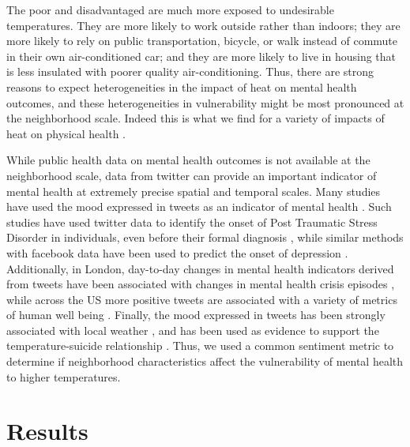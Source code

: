 \documentclass[fleqn,10pt]{wlscirep}
\begin{document}
The poor and disadvantaged are much more exposed to undesirable temperatures.  They are more likely to work outside rather than indoors; they are more likely to rely on public transportation, bicycle, or walk instead of commute in their own air-conditioned car; and they are more likely to live in housing that is less insulated with poorer quality air-conditioning.  Thus, there are strong reasons to expect heterogeneities in the impact of heat on mental health outcomes, and these heterogeneities in vulnerability might be most pronounced at the neighborhood scale.  Indeed this is what we find for a variety of impacts of heat on physical health  \cite{Belanger2015Mar, Uejio2011Mar}.

While public health data on mental health outcomes is not available at the neighborhood scale, data from twitter can provide an important indicator of mental health at extremely precise spatial and temporal scales.  Many studies have used the mood expressed in tweets as an indicator of mental health \cite{Edo-Osagie2020Jul, Sinnenberg2016Dec}.  Such studies have used twitter data to identify the onset of Post Traumatic Stress Disorder in individuals, even before their formal diagnosis \cite{Reece2017Oct}, while similar methods with facebook data have been used to predict the onset of depression \cite{Eichstaedt2018Oct}.  Additionally, in London, day-to-day changes in mental health indicators derived from tweets have been associated with changes in mental health crisis episodes \cite{Kolliakou2020Feb}, while across the US more positive tweets are associated with a variety of metrics of human well being \cite{Mitchell2013May}.  Finally, the mood expressed in tweets has been strongly associated with local weather \cite{baylis_weather_2018}, and has been used as evidence to support the temperature-suicide relationship \cite{Burke2018Aug}.  Thus, we used a common sentiment metric to determine if neighborhood characteristics affect the vulnerability of mental health to higher temperatures.

\section*{Results}
\end{document}
